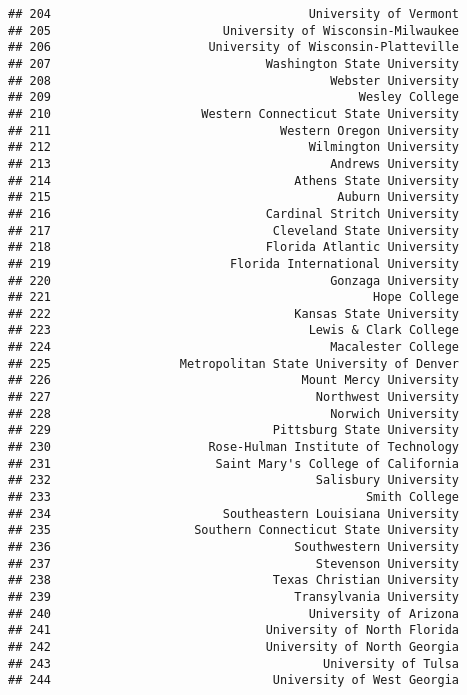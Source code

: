\documentclass[
]{article}
\begin{document}
\begin{verbatim}
## 204                                    University of Vermont
## 205                        University of Wisconsin-Milwaukee
## 206                      University of Wisconsin-Platteville
## 207                              Washington State University
## 208                                       Webster University
## 209                                           Wesley College
## 210                     Western Connecticut State University
## 211                                Western Oregon University
## 212                                    Wilmington University
## 213                                       Andrews University
## 214                                  Athens State University
## 215                                        Auburn University
## 216                              Cardinal Stritch University
## 217                               Cleveland State University
## 218                              Florida Atlantic University
## 219                         Florida International University
## 220                                       Gonzaga University
## 221                                             Hope College
## 222                                  Kansas State University
## 223                                    Lewis & Clark College
## 224                                       Macalester College
## 225                  Metropolitan State University of Denver
## 226                                   Mount Mercy University
## 227                                     Northwest University
## 228                                       Norwich University
## 229                               Pittsburg State University
## 230                      Rose-Hulman Institute of Technology
## 231                       Saint Mary's College of California
## 232                                     Salisbury University
## 233                                            Smith College
## 234                        Southeastern Louisiana University
## 235                    Southern Connecticut State University
## 236                                  Southwestern University
## 237                                     Stevenson University
## 238                               Texas Christian University
## 239                                  Transylvania University
## 240                                    University of Arizona
## 241                              University of North Florida
## 242                              University of North Georgia
## 243                                      University of Tulsa
## 244                               University of West Georgia

\end{verbatim}
\end{document}
